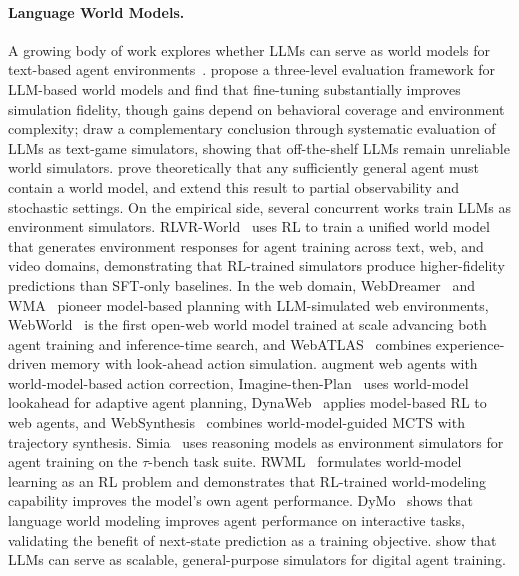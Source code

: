 \paragraph{Language World Models.}
A growing body of work explores whether LLMs can serve as world models for text-based agent environments~\citep{li2026bridgingagentworldgaptext}.
\citet{li2025word} propose a three-level evaluation framework for LLM-based world models and find that fine-tuning substantially improves simulation fidelity, though gains depend on behavioral coverage and environment complexity; \citet{wang2024can} draw a complementary conclusion through systematic evaluation of LLMs as text-game simulators, showing that off-the-shelf LLMs remain unreliable world simulators.
\citet{richens2025general} prove theoretically that any sufficiently general agent must contain a world model, and \citet{cifuentes2026general} extend this result to partial observability and stochastic settings.
On the empirical side, several concurrent works train LLMs as environment simulators.
RLVR-World~\citep{wu2026rlvr} uses RL to train a unified world model that generates environment responses for agent training across text, web, and video domains, demonstrating that RL-trained simulators produce higher-fidelity predictions than SFT-only baselines.
In the web domain, WebDreamer~\citep{gu2024your} and WMA~\citep{chae2025web} pioneer model-based planning with LLM-simulated web environments, WebWorld~\citep{xiao2026webworld} is the first open-web world model trained at scale advancing both agent training and inference-time search, and WebATLAS~\citep{cheng2025webatlas} combines experience-driven memory with look-ahead action simulation.
\citet{shen2026world} augment web agents with world-model-based action correction, Imagine-then-Plan~\citep{liu2026imagine} uses world-model lookahead for adaptive agent planning, DynaWeb~\citep{ding2026dynaweb} applies model-based RL to web agents, and WebSynthesis~\citep{gao2025websynthesis} combines world-model-guided MCTS with trajectory synthesis.
Simia~\citep{li2025simulating} uses reasoning models as environment simulators for agent training on the $\tau$-bench task suite.
RWML~\citep{yu2026reinforcement} formulates world-model learning as an RL problem and demonstrates that RL-trained world-modeling capability improves the model's own agent performance.
DyMo~\citep{guo2025world} shows that language world modeling improves agent performance on interactive tasks, validating the benefit of next-state prediction as a training objective.
\citet{wang2025llms} show that LLMs can serve as scalable, general-purpose simulators for digital agent training.
